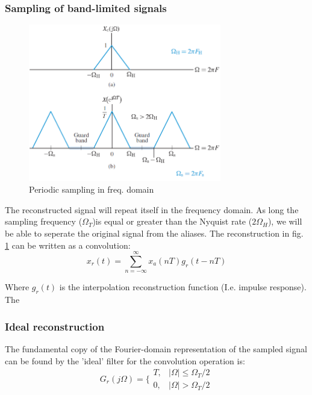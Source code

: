 \documentclass{article}
\begin{document}
\subsubsection{Sampling of band-limited signals}
\begin{figure}[h!]
    \centering
    \includegraphics[width=0.75\textwidth]{figures/Sampling and reconstruction/sampling_band_lim_signal.png}
    \caption{Periodic sampling in freq. domain}
    \label{fig:sampling_band_lim_signal}
\end{figure}
The reconstructed signal will repeat itself in the frequency domain. As long the sampling frequency ($\Omega_T$)is equal or greater than the Nyquist rate ($2\Omega_H$), we will be able to seperate the original signal from the aliases. The reconstruction in fig. \ref{fig:sampling_band_lim_signal} can be written as a convolution:
\begin{equation}
    x_r (t) = \sum_{n=-\infty}^{\infty} x_a (nT) g_r (t - nT) 
\end{equation}

Where $g_r (t)$ is the interpolation reconstruction function (I.e. impulse response). The 

\subsubsection{Ideal reconstruction}

The fundamental copy of the Fourier-domain representation of the sampled signal can be found by the 'ideal' filter for the convolution operation is: 
\begin{equation}
    G_r (j\Omega) = \bigg\{ \begin{matrix}
        T, & |\Omega| \leq \Omega_T /2 \\
        0, & |\Omega| > \Omega_T / 2
    \end{matrix}
\end{equation}
\end{document}
